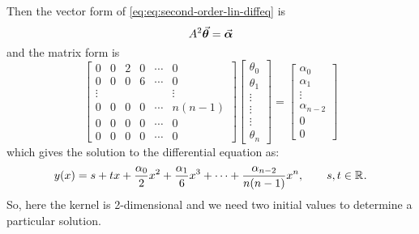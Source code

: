 \documentclass[MathsNotesBase.tex]{subfiles}
\begin{document}
{		Then the vector form of \autoref{eq:eq:second-order-lin-diffeq} is
		\begin{equation}
			A^2 \vec{\bm{\theta}} = \vec{\bm{\alpha}}
		\end{equation}
		and the matrix form is
		\begin{equation}
			\begin{bmatrix}
			0 & 0 & 2 & 0 & \cdots & 0\\
			0 & 0 & 0 & 6 & \cdots & 0\\
			\vdots &  &  &  &  & \vdots\\
			0 & 0 & 0 & 0 & \cdots & n(n-1)\\
			0 & 0 & 0 & 0 & \cdots & 0\\
			0 & 0 & 0 & 0 & \cdots & 0
			\end{bmatrix}\begin{bmatrix}\theta_0\\\theta_1\\\vdots\\\vdots\\\vdots\\\theta_n\end{bmatrix} = \begin{bmatrix}\alpha_0\\\alpha_1\\\vdots\\\alpha_{n-2}\\0\\0\end{bmatrix}
		\end{equation}
		which gives the solution to the differential equation as:
		\begin{equation}\label{eq:general-first-order-lin-diff-eq-soln}
		y(x) = s + tx + \frac{\alpha_0}{2} x^2 + \frac{\alpha_1}{6} x^3 + \cdots + \frac{\alpha_{n-2}}{n(n-1)} x^n, \hspace{20pt} s,t \in \mathbb{R}^{}.
		\end{equation}
		So, here the kernel is 2-dimensional and we need two initial values to determine a particular solution.
		
		\bigskip
}
\end{document}
